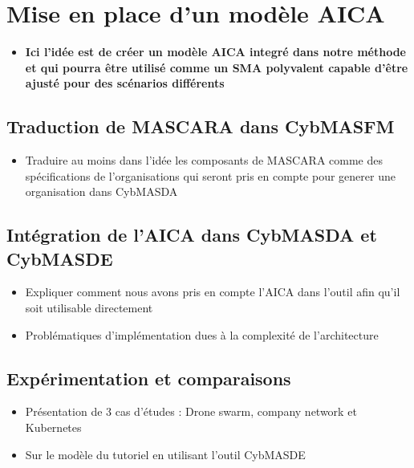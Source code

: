 \chapter{Mise en place d'un modèle AICA}\label{ch:aica_model} %

\begin{itemize}

    \item \textbf{Ici l'idée est de créer un modèle AICA integré dans notre méthode et qui pourra être utilisé comme un SMA polyvalent capable d'être ajusté pour des scénarios différents}
\end{itemize}
\section{Traduction de MASCARA dans CybMASFM}
\begin{itemize}

    \item Traduire au moins dans l'idée les composants de MASCARA comme des spécifications de l'organisations qui seront pris en compte pour generer une organisation dans CybMASDA
\end{itemize}
\section{Intégration de l'AICA dans CybMASDA et CybMASDE}
\begin{itemize}

    \item Expliquer comment nous avons pris en compte l'AICA dans l'outil afin qu'il soit utilisable directement
    \item Problématiques d'implémentation dues à la complexité de l'architecture
\end{itemize}


\section{Expérimentation et comparaisons}
\begin{itemize}

    \item Présentation de 3 cas d’études : Drone swarm, company network et Kubernetes
    \item Sur le modèle du tutoriel en utilisant l'outil CybMASDE
\end{itemize}
